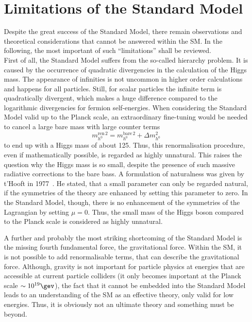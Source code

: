 \section{Limitations of the Standard Model}
\label{sec:Limitations}
Despite the great success of the Standard Model, there remain observations and theoretical considerations that cannot be answered within the SM.
In the following, the most important of such ``limitations'' shall be reviewed.\\

First of all, the Standard Model suffers from the so-called hierarchy problem.
It is caused by the occurrence of quadratic divergencies in the calculation of the Higgs mass.
The appearance of infinities is not uncommon in higher order calculations and happens for all particles. 
Still, for scalar particles the infinite term is quadratically divergent, which makes a huge difference compared to the logarithmic divergencies for fermion self-energies. 
When considering the Standard Model valid up to the Planck scale, an extraordinary fine-tuning would be needed to cancel a large bare mass with large counter terms 
\begin{equation}
 m^{\text{ren}\,2}_{h^0} = m_{h^0}^{\text{bare}\,2} + \Delta m^2_{h^0}
\end{equation}
to end up with a Higgs mass of about 125\gev.
Thus, this renormalisation procedure, even if mathematically possible, is regarded as highly unnatural.
This raises the question why the Higgs mass is so small, despite the presence of such massive radiative corrections to the bare bass.
A formulation of naturalness was given by t'Hooft in 1977~\cite{bib:Naturalness_tHooft}. 
He stated, that a small parameter can only be regarded natural, if the symmetries of the theory are enhanced by setting this parameter to zero.
In the Standard Model, though, there is no enhancement of the symmetries of the Lagrangian by setting $\mu=0$.
Thus, the small mass of the Higgs boson compared to the Planck scale is considered as highly unnatural.

A further and probably the most striking shortcoming of the Standard Model is the missing fourth fundamental force, the gravitational force.
Within the SM, it is not possible to add renormalisable terms, that can describe the gravitational force.
Although, gravity is not important for particle physics at energies that are accessible at current particle colliders (it only becomes important at the Planck scale $\sim 10^{19}\gev$), the fact that it cannot be embedded into the Standard Model leads to an understanding of the SM as an effective theory, only valid for low energies.
Thus, it is obviously not an ultimate theory and something must be beyond.


